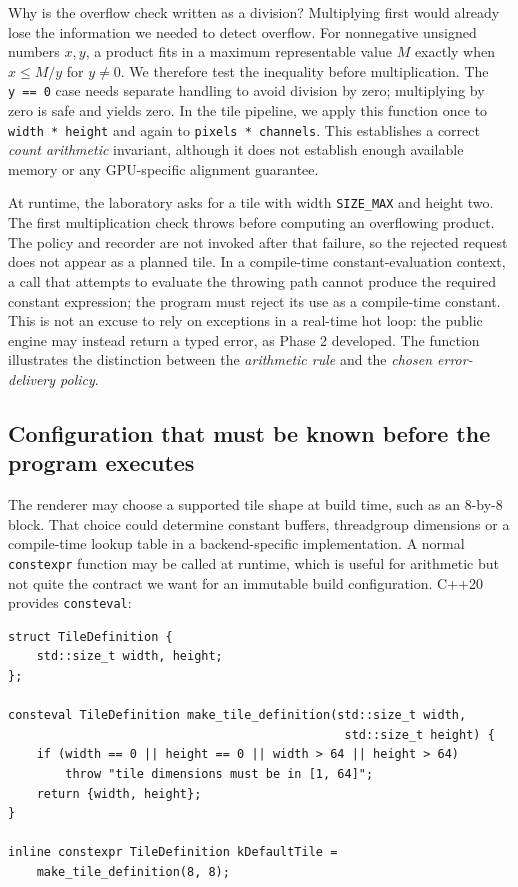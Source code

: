 Why is the overflow check written as a division? Multiplying first would already lose the information we needed to detect overflow. For nonnegative unsigned numbers \(x,y\), a product fits in a maximum representable value \(M\) exactly when \(x\le M/y\) for \(y\ne0\). We therefore test the inequality before multiplication. The \texttt{y\ ==\ 0} case needs separate handling to avoid division by zero; multiplying by zero is safe and yields zero. In the tile pipeline, we apply this function once to \texttt{width\ *\ height} and again to \texttt{pixels\ *\ channels}. This establishes a correct \emph{count arithmetic} invariant, although it does not establish enough available memory or any GPU-specific alignment guarantee.

At runtime, the laboratory asks for a tile with width \texttt{SIZE\_MAX} and height two. The first multiplication check throws before computing an overflowing product. The policy and recorder are not invoked after that failure, so the rejected request does not appear as a planned tile. In a compile-time constant-evaluation context, a call that attempts to evaluate the throwing path cannot produce the required constant expression; the program must reject its use as a compile-time constant. This is not an excuse to rely on exceptions in a real-time hot loop: the public engine may instead return a typed error, as Phase 2 developed. The function illustrates the distinction between the \emph{arithmetic rule} and the \emph{chosen error-delivery policy}.

\subsection{Configuration that must be known before the program executes}\label{01-foundations-i-ch005-configuration-that-must-be-known-before-the-program-executes}

The renderer may choose a supported tile shape at build time, such as an 8-by-8 block. That choice could determine constant buffers, threadgroup dimensions or a compile-time lookup table in a backend-specific implementation. A normal \texttt{constexpr} function may be called at runtime, which is useful for arithmetic but not quite the contract we want for an immutable build configuration. C++20 provides \texttt{consteval}:

\begin{verbatim}
struct TileDefinition {
    std::size_t width, height;
};

consteval TileDefinition make_tile_definition(std::size_t width,
                                               std::size_t height) {
    if (width == 0 || height == 0 || width > 64 || height > 64)
        throw "tile dimensions must be in [1, 64]";
    return {width, height};
}

inline constexpr TileDefinition kDefaultTile =
    make_tile_definition(8, 8);
\end{verbatim}

